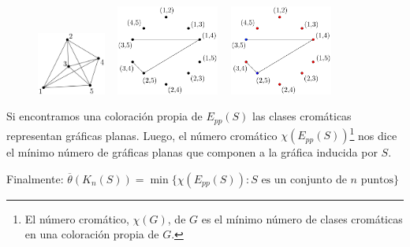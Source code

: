 \begin{frame}
	\begin{figure}
	\centering
	\includegraphics[width=0.2\textwidth]{images/K5}%
	~\vrule
	\includegraphics[width=0.3\textwidth]{images/EppK5}
	~\vrule
	\includegraphics[width=0.3\textwidth]{images/EppK5_colored}
	\end{figure}
	Si encontramos una coloración propia de $E_{pp}(S)$ las clases cromáticas representan gráficas planas. Luego, el número cromático $\chi(E_{pp}(S))$\footnote{El número cromático, $\chi(G)$, de $G$ es el mínimo número de clases cromáticas en una coloración propia de $G$.} nos dice el mínimo número de gráficas planas que componen a la gráfica inducida por $S$.
	
	Finalmente: $\overline{\theta}(K_n(S)) = \min\{\chi(E_{pp}(S)) : S \text{ es un conjunto de $n$ puntos}\}$
\end{frame}

